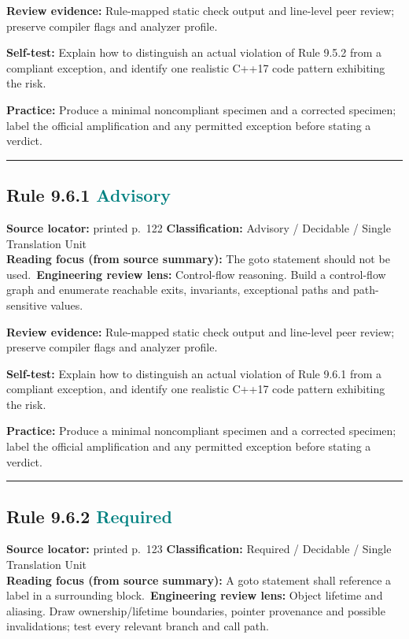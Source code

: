 \documentclass[10pt,letterpaper]{article}
\begin{document}
\textbf{Review evidence:} Rule-mapped static check output and line-level peer review; preserve compiler flags and analyzer profile.

\textbf{Self-test:} Explain how to distinguish an actual violation of Rule 9.5.2 from a compliant exception, and identify one realistic C++17 code pattern exhibiting the risk.\par
\textbf{Practice:} Produce a minimal noncompliant specimen and a corrected specimen; label the official amplification and any permitted exception before stating a verdict.
\smallskip\hrule\smallskip
\subsection*{Rule 9.6.1 \enspace \texorpdfstring{\small\textcolor{teal}{Advisory}}{Advisory}}
\noindent\textbf{Source locator:} printed p.~122 \quad\textbf{Classification:} Advisory / Decidable / Single Translation Unit\\
\textbf{Reading focus (from source summary):} The goto statement should not be used.\
\textbf{Engineering review lens:} Control-flow reasoning. Build a control-flow graph and enumerate reachable exits, invariants, exceptional paths and path-sensitive values.

\textbf{Review evidence:} Rule-mapped static check output and line-level peer review; preserve compiler flags and analyzer profile.

\textbf{Self-test:} Explain how to distinguish an actual violation of Rule 9.6.1 from a compliant exception, and identify one realistic C++17 code pattern exhibiting the risk.\par
\textbf{Practice:} Produce a minimal noncompliant specimen and a corrected specimen; label the official amplification and any permitted exception before stating a verdict.
\smallskip\hrule\smallskip
\subsection*{Rule 9.6.2 \enspace \texorpdfstring{\small\textcolor{teal}{Required}}{Required}}
\noindent\textbf{Source locator:} printed p.~123 \quad\textbf{Classification:} Required / Decidable / Single Translation Unit\\
\textbf{Reading focus (from source summary):} A goto statement shall reference a label in a surrounding block.\
\textbf{Engineering review lens:} Object lifetime and aliasing. Draw ownership/lifetime boundaries, pointer provenance and possible invalidations; test every relevant branch and call path.
\end{document}
